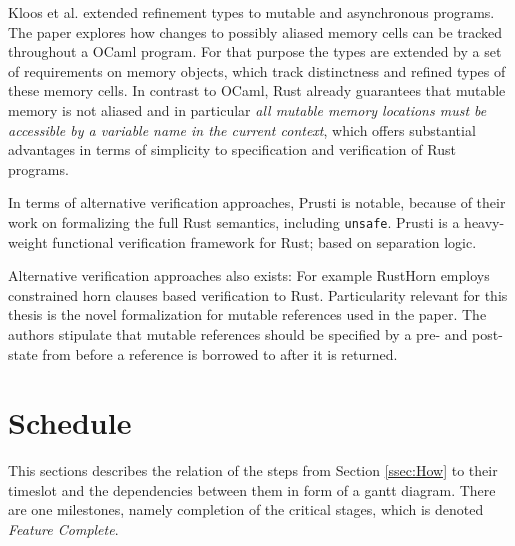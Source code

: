 \documentclass[11pt]{article}
\newcommand{\code}[1]{\texttt{#1}}
\begin{document}
Kloos et al. \cite{kloos_asynchronous_2015} extended refinement types to mutable and asynchronous programs. The paper explores how changes to possibly aliased memory cells can be tracked throughout a OCaml program. For that purpose the types are extended by a set of requirements on memory objects, which track distinctness and refined types of these memory cells. In contrast to OCaml, Rust already guarantees that mutable memory is not aliased and in particular \textit{all mutable memory locations must be accessible by a variable name in the current context}, which offers substantial advantages in terms of simplicity to specification and verification of Rust programs.

In terms of alternative verification approaches, Prusti\cite{astrauskas_leveraging_2019} is notable, because of their work on formalizing the full Rust semantics, including \code{unsafe}. Prusti is a heavy-weight functional verification framework for Rust; based on separation logic.

Alternative verification approaches also exists: For example RustHorn\cite{matsushita_rusthorn_2020} employs constrained horn clauses based verification to Rust. Particularity relevant for this thesis is the novel formalization for mutable references used in the paper. The authors stipulate that mutable references should be specified by a pre- and post-state from before a reference is borrowed to after it is returned.

\section{Schedule} \label{sec:schedule}

This sections describes the relation of the steps from Section \ref{ssec:How} to their timeslot and the dependencies between them in form of a gantt diagram. There are one milestones, namely completion of the critical stages, which is denoted \textit{Feature Complete}.


\end{document}
